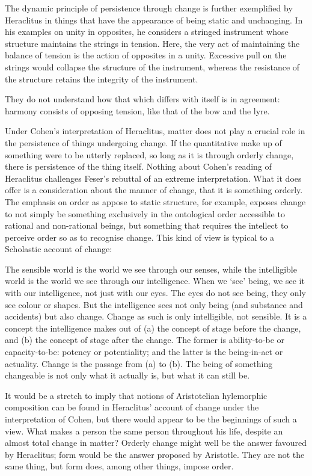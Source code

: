 The dynamic principle of persistence through change is further exemplified by Heraclitus in things that have the appearance of being static and unchanging. In his examples on unity in opposites, he considers a stringed instrument whose structure maintains the strings in tension. Here, the very act of maintaining the balance of tension is the action of opposites in a unity. Excessive pull on the strings would collapse the structure of the instrument, whereas the resistance of the structure retains the integrity of the instrument.
\begin{quoting}
They do not understand how that which differs with itself is in agreement: harmony consists of opposing tension, like that of the bow and the lyre. \parencite[][29]{fitt1983ancilla}
\end{quoting}

Under Cohen's interpretation of Heraclitus, matter does not play a crucial role in the persistence of things undergoing change. If the quantitative make up of something were to be utterly replaced, so long as it is through orderly change, there is persistence of the thing itself. Nothing about Cohen's reading of Heraclitus challenges Feser's rebuttal of an extreme interpretation. What it does offer is a consideration about the manner of change, that it is something orderly. The emphasis on order as appose to static structure, for example, exposes change to not simply be something exclusively in the ontological order accessible to rational and non-rational beings, but something that requires the intellect to perceive order so as to recognise change. This kind of view is typical to a Scholastic account of change:
\begin{quoting} \label{quote-torre-change}
The sensible world is the world we see through our senses, while the intelligible world is the world we see through our intelligence. When we `see' being, we see it with our intelligence, not just with our eyes. The eyes do not see being, they only see colour or shapes. But the intelligence sees not only being (and substance and accidents) but also change. Change as such is only intelligible, not sensible. It is a concept the intelligence makes out of (a) the concept of stage before the change, and (b) the concept of stage after the change. The former is ability-to-be or capacity-to-be: potency or potentiality; and the latter is the being-in-act or actuality. Change is the passage from (a) to (b). The being of something changeable is not only what it actually is, but what it can still be. \parencite[][48]{de1981christian}
\end{quoting}
It would be a stretch to imply that notions of Aristotelian hylemorphic composition can be found in Heraclitus' account of change under the interpretation of Cohen, but there would appear to be the beginnings of such a view. What makes a person the same person throughout his life, despite an almost total change in matter? Orderly change might well be the answer favoured by Heraclitus; form would be the answer proposed by Aristotle. They are not the same thing, but form does, among other things, impose order.


